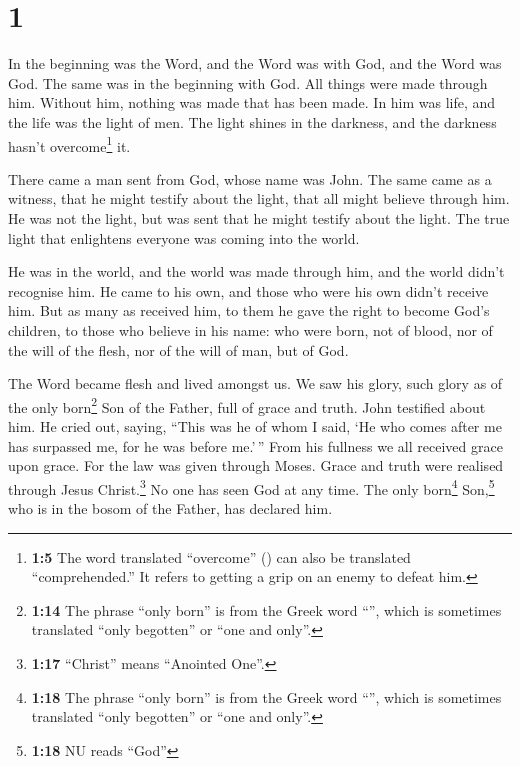 \hypertarget{section}{%
\section{1}\label{section}}

 In the beginning was the Word, and the Word was with God,
and the Word was God.  The same was in the beginning with
God.  All things were made through him. Without him,
nothing was made that has been made.  In him was life, and
the life was the light of men.  The light shines in the
darkness, and the darkness hasn't overcome\footnote{\textbf{1:5} The
  word translated ``overcome'' () can also be
  translated ``comprehended.'' It refers to getting a grip on an enemy
  to defeat him.} it.

 There came a man sent from God, whose name was John.
 The same came as a witness, that he might testify about
the light, that all might believe through him.  He was not
the light, but was sent that he might testify about the light.
 The true light that enlightens everyone was coming into
the world.

 He was in the world, and the world was made through him,
and the world didn't recognise him.  He came to his own,
and those who were his own didn't receive him.  But as
many as received him, to them he gave the right to become God's
children, to those who believe in his name:  who were
born, not of blood, nor of the will of the flesh, nor of the will of
man, but of God.

 The Word became flesh and lived amongst us. We saw his
glory, such glory as of the only born\footnote{\textbf{1:14} The phrase
  ``only born'' is from the Greek word ``'', which is
  sometimes translated ``only begotten'' or ``one and only''.} Son of
the Father, full of grace and truth.  John testified
about him. He cried out, saying, ``This was he of whom I said, `He who
comes after me has surpassed me, for he was before me.'\,''
 From his fullness we all received grace upon grace.
 For the law was given through Moses. Grace and truth
were realised through Jesus Christ.\footnote{\textbf{1:17} ``Christ''
  means ``Anointed One''.}  No one has seen God at any
time. The only born\footnote{\textbf{1:18} The phrase ``only born'' is
  from the Greek word ``'', which is sometimes
  translated ``only begotten'' or ``one and only''.} Son,\footnote{\textbf{1:18}
  NU reads ``God''} who is in the bosom of the Father, has declared him.

